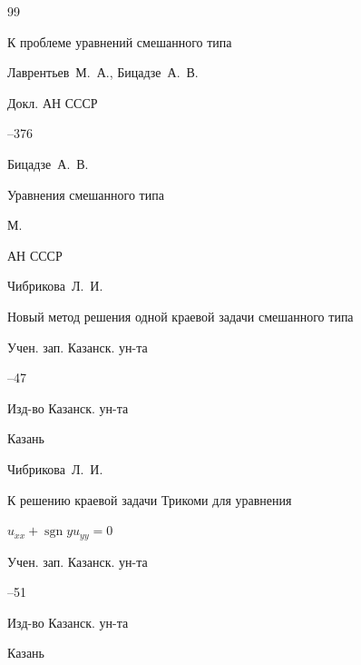 \begin{thebibliography}{99}




\paper К проблеме уравнений смешанного типа

\by Лаврентьев~М.~А., Бицадзе~А.~В.

\jour Докл. АН СССР




--376





\by Бицадзе~А.~В.

\book Уравнения смешанного типа

\publaddr М.

\publ АН СССР






\by Чибрикова~Л.~И.

\paper Новый метод решения одной краевой задачи смешанного типа

\serial Учен. зап. Казанск. ун-та




--47

\publ Изд-во Казанск. ун-та

\publaddr Казань




\by Чибрикова~Л.~И.

\paper К решению краевой задачи Трикоми для уравнения

${u_{xx}+\operatorname{sgn}yu_{yy}=0}$

\serial Учен. зап. Казанск. ун-та




--51

\publ Изд-во Казанск. ун-та

\publaddr Казань




\end{thebibliography}
